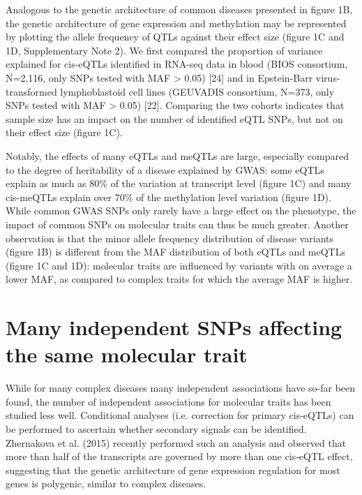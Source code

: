 Analogous to the genetic architecture of common diseases presented in figure 1B, the genetic architecture of gene expression and methylation may be represented by plotting the allele frequency of QTLs against their effect size (figure 1C and 1D, Supplementary Note 2). We first compared the proportion of variance explained for cis-eQTLs identified in RNA-seq data in blood (BIOS consortium, N=2,116, only SNPs tested with MAF > 0.05) [24] and in Epstein-Barr virus-transformed lymphoblastoid cell lines (GEUVADIS consortium, N=373, only SNPs tested with MAF > 0.05) [22]. Comparing the two cohorts indicates that sample size has an impact on the number of identified eQTL SNPs, but not on their effect size (figure 1C). 

Notably, the effects of many eQTLs and meQTLs are large, especially compared to the degree of heritability of a disease explained by GWAS: some eQTLs explain as much as 80\% of the variation at transcript level (figure 1C) and many cis-meQTLs explain over 70\% of the methylation level variation (figure 1D). While common GWAS SNPs only rarely have a large effect on the phenotype, the impact of common SNPs on molecular traits can thus be much greater. 
Another observation is that the minor allele frequency distribution of disease variants (figure 1B) is different from the MAF distribution of both eQTLs and meQTLs (figure 1C and 1D): molecular traits are influenced by variants with on average a lower MAF, as compared to complex traits for which the average MAF is higher.

\section{Many independent SNPs affecting the same molecular trait}
While for many complex diseases many independent associations have so-far been found, the number of independent associations for molecular traits has been studied less well. Conditional analyses (i.e. correction for primary cis-eQTLs) can be performed to ascertain whether secondary signals can be identified. Zhernakova et al. (2015) recently performed such an analysis and observed that more than half of the transcripts are governed by more than one cis-eQTL effect, suggesting that the genetic architecture of gene expression regulation for most genes is polygenic, similar to complex diseases.

